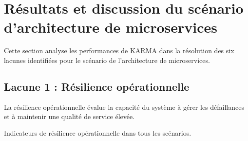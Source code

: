 \section{Résultats et discussion du scénario d'architecture de microservices}\label{sec:results_and_discussion_ms}

Cette section analyse les performances de KARMA dans la résolution des six lacunes identifiées pour le scénario de l'architecture de microservices.

\subsection{Lacune 1 : Résilience opérationnelle}
La résilience opérationnelle évalue la capacité du système à gérer les défaillances et à maintenir une qualité de service élevée.
\begin{table}[h]
  \centering
  \caption{Indicateurs de résilience opérationnelle dans tous les scénarios.}
  \label{tab:operational_resilience}


\end{table}
